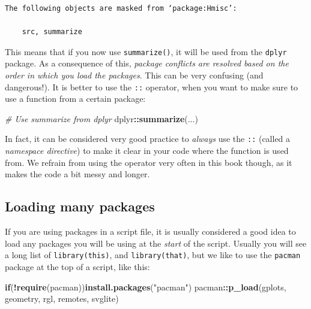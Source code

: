 \documentclass[]{book}
\newenvironment{Shaded}{\begin{snugshade}}{\end{snugshade}}
\newcommand{\CommentTok}[1]{\textcolor[rgb]{0.56,0.35,0.01}{\textit{#1}}}
\newcommand{\ControlFlowTok}[1]{\textcolor[rgb]{0.13,0.29,0.53}{\textbf{#1}}}
\newcommand{\KeywordTok}[1]{\textcolor[rgb]{0.13,0.29,0.53}{\textbf{#1}}}
\newcommand{\NormalTok}[1]{#1}
\newcommand{\OperatorTok}[1]{\textcolor[rgb]{0.81,0.36,0.00}{\textbf{#1}}}
\newcommand{\StringTok}[1]{\textcolor[rgb]{0.31,0.60,0.02}{#1}}
\begin{document}
\begin{verbatim}
The following objects are masked from ‘package:Hmisc’:

    src, summarize
\end{verbatim}

This means that if you now use \texttt{summarize()}, it will be used from the \texttt{dplyr} package. As a consequence of this, \emph{package conflicts are resolved based on the order in which you load the packages}. This can be very confusing (and dangerous!). It is better to use the \texttt{::} operator, when you want to make sure to use a function from a certain package:

\begin{Shaded}
\begin{Highlighting}[]
\CommentTok{# Use summarize from dplyr}
\NormalTok{dplyr}\OperatorTok{::}\KeywordTok{summarize}\NormalTok{(...)}
\end{Highlighting}
\end{Shaded}

In fact, it can be considered very good practice to \emph{always} use the \texttt{::} (called a \emph{namespace directive}) to make it clear in your code where the function is used from. We refrain from using the operator very often in this book though, as it makes the code a bit messy and longer.

\hypertarget{loading-many-packages}{%
\subsection{Loading many packages}\label{loading-many-packages}}

If you are using packages in a script file, it is usually considered a good idea to load any packages you will be using at the \emph{start} of the script. Usually you will see a long list of \texttt{library(this)}, and \texttt{library(that)}, but we like to use the \texttt{pacman} package at the top of a script, like this:

\begin{Shaded}
\begin{Highlighting}[]
\ControlFlowTok{if}\NormalTok{(}\OperatorTok{!}\KeywordTok{require}\NormalTok{(pacman))}\KeywordTok{install.packages}\NormalTok{(}\StringTok{"pacman"}\NormalTok{)}
\NormalTok{pacman}\OperatorTok{::}\KeywordTok{p_load}\NormalTok{(gplots, geometry, rgl, remotes, svglite)}
\end{Highlighting}
\end{Shaded}
\end{document}
